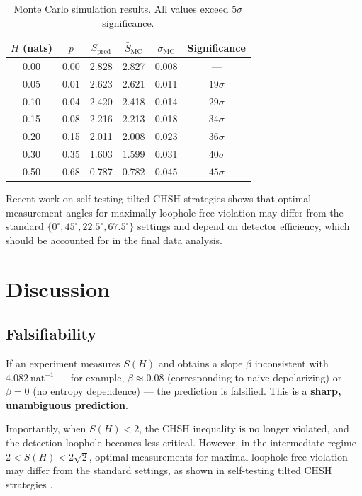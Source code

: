 \documentclass[a4paper]{quantumarticle}
\begin{document}
\begin{table}[H]
\centering
\begin{tabular}{cccccc}
\toprule
$H$ (nats) & $p$ & $S_{\text{pred}}$ & $\bar{S}_{\text{MC}}$ & $\sigma_{\text{MC}}$ & Significance \\
\midrule
0.00 & 0.00 & 2.828 & 2.827 & 0.008 & --- \\
0.05 & 0.01 & 2.623 & 2.621 & 0.011 & $19\sigma$ \\
0.10 & 0.04 & 2.420 & 2.418 & 0.014 & $29\sigma$ \\
0.15 & 0.08 & 2.216 & 2.213 & 0.018 & $34\sigma$ \\
0.20 & 0.15 & 2.011 & 2.008 & 0.023 & $36\sigma$ \\
0.30 & 0.35 & 1.603 & 1.599 & 0.031 & $40\sigma$ \\
0.50 & 0.68 & 0.787 & 0.782 & 0.045 & $45\sigma$ \\
\bottomrule
\end{tabular}
\caption{Monte Carlo simulation results. All values exceed $5\sigma$ significance.}
\label{tab:mcresults}
\end{table}

Recent work on self-testing tilted CHSH strategies \cite{selftesting2025} shows that optimal measurement angles for maximally loophole-free violation may differ from the standard $\{0^\circ, 45^\circ, 22.5^\circ, 67.5^\circ\}$ settings and depend on detector efficiency, which should be accounted for in the final data analysis.

\section{Discussion}

\subsection{Falsifiability}

If an experiment measures $S(H)$ and obtains a slope $\beta$ inconsistent with $4.082\ \text{nat}^{-1}$ --- for example, $\beta \approx 0.08$ (corresponding to naive depolarizing) or $\beta = 0$ (no entropy dependence) --- the prediction is falsified. This is a \textbf{sharp, unambiguous prediction}.

Importantly, when $S(H) < 2$, the CHSH inequality is no longer violated, and the detection loophole becomes less critical. However, in the intermediate regime $2 < S(H) < 2\sqrt{2}$, optimal measurements for maximal loophole-free violation may differ from the standard settings, as shown in self-testing tilted CHSH strategies \cite{selftesting2025}.
\end{document}
